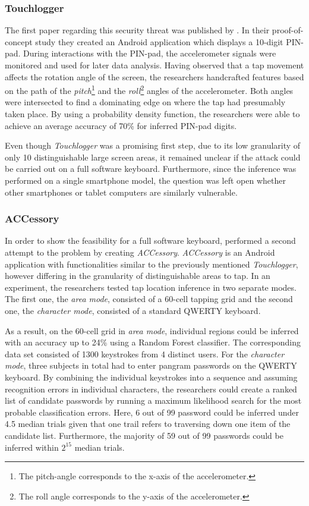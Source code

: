 \subsubsection{Touchlogger}

The first paper regarding this security threat was published by \citeauthor{Touchlogger}. In their proof-of-concept study they created an Android application which displays a 10-digit PIN-pad. During interactions with the PIN-pad, the accelerometer signals were monitored and used for later data analysis. Having observed that a tap movement affects the rotation angle of the screen, the researchers handcrafted features based on the path of the \textit{pitch}\footnote{The pitch-angle corresponds to the x-axis of the accelerometer.} and the \textit{roll}\footnote{The roll angle corresponds to the y-axis of the accelerometer.} angles of the accelerometer. Both angles were intersected to find a dominating edge on where the tap had presumably taken place. By using a probability density function, the researchers were able to achieve an average accuracy of 70\% for inferred PIN-pad digits.

Even though \textit{Touchlogger} was a promising first step, due to its low granularity of only 10 distinguishable large screen areas, it remained unclear if the attack could be carried out on a full software keyboard. Furthermore, since the inference was performed on a single smartphone model, the question was left open whether other smartphones or tablet computers are similarly vulnerable.

\subsubsection{ACCessory}

In order to show the feasibility for a full software keyboard, \citeauthor{Accessory} performed a second attempt to the problem by creating \textit{ACCessory}. \textit{ACCessory} is an Android application with functionalities similar to the previously mentioned \textit{Touchlogger}, however differing in the granularity of distinguishable areas to tap. In an experiment, the researchers tested tap location inference in two separate modes. The first one, the \textit{area mode}, consisted of a 60-cell tapping grid and the second one, the \textit{character mode}, consisted of a standard QWERTY keyboard. 

As a result, on the 60-cell grid in \textit{area mode}, individual regions could be inferred with an accuracy up to 24\% using a Random Forest classifier. The corresponding data set consisted of 1300 keystrokes from 4 distinct users. 
For the \textit{character mode}, three subjects in total had to enter pangram passwords on the QWERTY keyboard. By combining the individual keystrokes into a sequence and assuming recognition errors in individual characters, the researchers could create a ranked list of candidate passwords by running a maximum likelihood search for the most probable classification errors. Here, 6 out of 99 password could be inferred under 4.5 median trials given that one trail refers to traversing down one item of the candidate list. Furthermore, the majority of 59 out of 99 passwords could be inferred within $2^{15}$ median trials.

